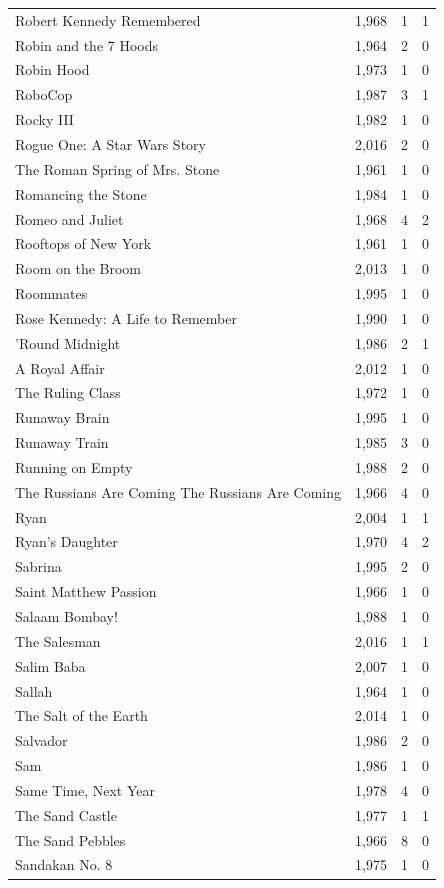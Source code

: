 \begin{tabular}{lrrr}
Robert Kennedy Remembered & 1,968 & 1 & 1 \\
Robin and the 7 Hoods & 1,964 & 2 & 0 \\
Robin Hood & 1,973 & 1 & 0 \\
RoboCop & 1,987 & 3 & 1 \\
Rocky III & 1,982 & 1 & 0 \\
Rogue One: A Star Wars Story & 2,016 & 2 & 0 \\
The Roman Spring of Mrs. Stone & 1,961 & 1 & 0 \\
Romancing the Stone & 1,984 & 1 & 0 \\
Romeo and Juliet & 1,968 & 4 & 2 \\
Rooftops of New York & 1,961 & 1 & 0 \\
Room on the Broom & 2,013 & 1 & 0 \\
Roommates & 1,995 & 1 & 0 \\
Rose Kennedy: A Life to Remember & 1,990 & 1 & 0 \\
'Round Midnight & 1,986 & 2 & 1 \\
A Royal Affair & 2,012 & 1 & 0 \\
The Ruling Class & 1,972 & 1 & 0 \\
Runaway Brain & 1,995 & 1 & 0 \\
Runaway Train & 1,985 & 3 & 0 \\
Running on Empty & 1,988 & 2 & 0 \\
The Russians Are Coming The Russians Are Coming & 1,966 & 4 & 0 \\
Ryan & 2,004 & 1 & 1 \\
Ryan's Daughter & 1,970 & 4 & 2 \\
Sabrina & 1,995 & 2 & 0 \\
Saint Matthew Passion & 1,966 & 1 & 0 \\
Salaam Bombay! & 1,988 & 1 & 0 \\
The Salesman & 2,016 & 1 & 1 \\
Salim Baba & 2,007 & 1 & 0 \\
Sallah & 1,964 & 1 & 0 \\
The Salt of the Earth & 2,014 & 1 & 0 \\
Salvador & 1,986 & 2 & 0 \\
Sam & 1,986 & 1 & 0 \\
Same Time, Next Year & 1,978 & 4 & 0 \\
The Sand Castle & 1,977 & 1 & 1 \\
The Sand Pebbles & 1,966 & 8 & 0 \\
Sandakan No. 8 & 1,975 & 1 & 0 \\

\end{tabular}
